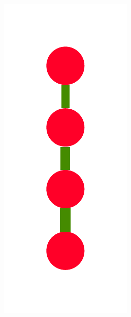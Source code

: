 \documentclass[a4paper,10pt]{article}
\begin{document}
\begin{figure}
{    \includegraphics[scale=.14]{../figures/vector/6-3-recursion-data-7.pdf}
}
\end{figure}
\end{document}
